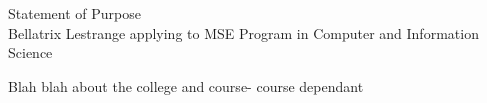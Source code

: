 \documentclass{article}
\begin{document}
\begin{center}
\LARGE{Statement of Purpose}\\[2ex]

\large{ Bellatrix Lestrange applying to MSE Program in Computer and Information Science }
\end{center}

\bigskip

Blah blah about the college and course- course dependant
\end{document}

